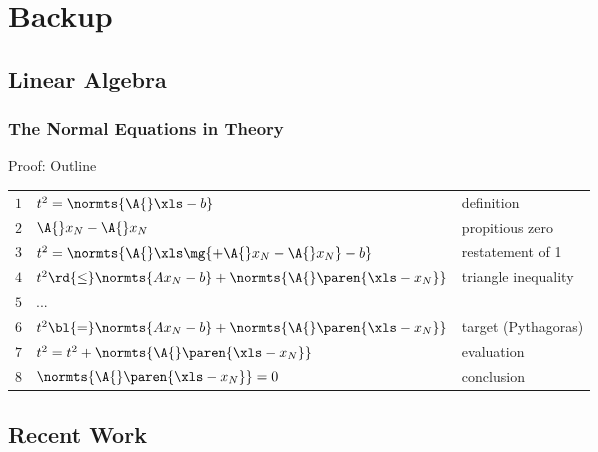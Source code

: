 % 

\section{Backup}

\subsection{Linear Algebra}
%
\begin{frame}\frametitle{The Normal Equations in Theory}
Proof: Outline
\begin{table}[htp]
\begin{center}
\begin{tabular}{lll}
	$1$ & $t^{2}= \normts{\A{}\xls - b}$ & definition \\[5pt]
	$2$ & $\A{}x_{N} - \A{}x_{N}$ & propitious zero \\[5pt]
	$3$ & $t^{2}= \normts{\A{}\xls \mg{+ \A{}x_{N} - \A{}x_{N}} - b}$ & restatement of 1 \\[5pt]
	$4$ & $t^{2} \rd{\le} \normts{A{}x_{N} - b} + \normts{\A{}\paren{\xls -x_{N}}}$ & triangle inequality \\[5pt]
	$5$ & $...$ & \bl{Miracle}\\[5pt]
	$6$ & $t^{2} \bl{=} \normts{A{}x_{N} - b} + \normts{\A{}\paren{\xls -x_{N}}}$ & target (Pythagoras)\\[5pt]
	$7$ & $t^{2} = t^{2} + \normts{\A{}\paren{\xls -x_{N}}}$ & evaluation\\[5pt]
	$8$ & $\normts{\A{}\paren{\xls -x_{N}}} = 0$ & conclusion\\
\end{tabular}
\end{center}
\end{table}%
\end{frame}




\subsection{Recent Work}

\endinput  %
